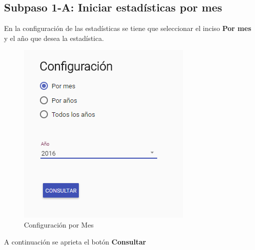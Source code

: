 \subsection{Subpaso 1-A: Iniciar estadísticas por mes}
	En la configuración de las estadísticas se tiene que seleccionar el 
	inciso \textbf{Por mes} y el año que desea la estadística. 
		
	\begin{figure}[hbtp]

	\includegraphics[scale=0.5]{images/Interfaz/IUGS15_configuracionMes.PNG}
	\caption{Configuración por Mes }
	\end{figure}
	A continuación se aprieta el botón \textbf{Consultar}
	
